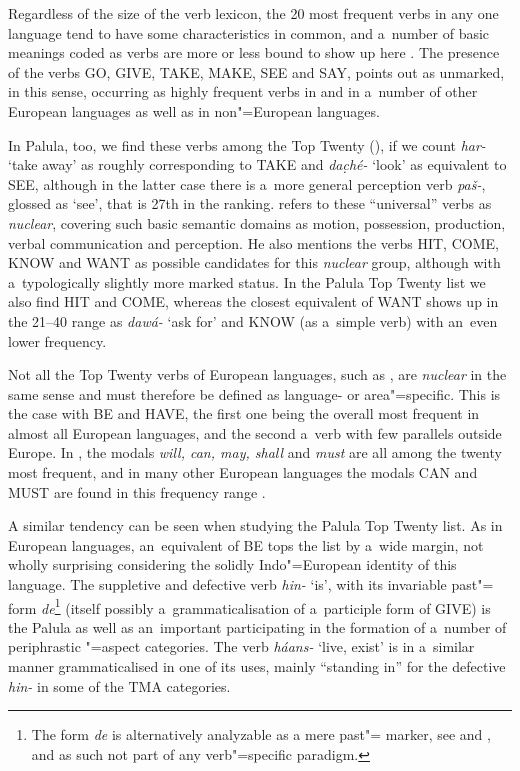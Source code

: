 Regardless of the size of the verb lexicon, the 20 most frequent verbs in any one language tend to have some characteristics in common, and a~number of basic meanings coded as verbs are more or less bound to show up here \citep[209]{viberg2006}. The presence of the verbs GO, GIVE, TAKE, MAKE, SEE and SAY, \citet[247]{viberg1993} points out as unmarked, in this sense, occurring as highly frequent verbs in  and in a~number of other European languages as well as in non"=European languages. 



In Palula, too, we find these verbs among the Top Twenty (), if we count \textit{har-} `take away' as roughly corresponding to TAKE and \textit{dac̣hé-} `look' as equivalent to SEE, although in the latter case there is a~more general perception verb \textit{paš-}, glossed as `see', that is 27th in the ranking. \citet[409]{viberg2006} refers to these ``universal'' verbs as \textit{nuclear}, covering such basic semantic domains as motion, possession, production, verbal communication and perception. He also mentions the verbs HIT, COME, KNOW and WANT as possible candidates for this \textit{nuclear} group, although with a~typologically slightly more marked status. In the Palula Top Twenty list we also find HIT and COME, whereas the closest equivalent of WANT shows up in the 21--40 range as \textit{dawá-} `ask for' and KNOW (as a~simple verb) with an~even lower frequency.



Not all the Top Twenty verbs of European languages, such as , are \textit{nuclear} in the same sense and must therefore be defined as language- or area"=specific. This is the case with BE and HAVE, the first one being the overall most frequent in almost all European languages, and the second a~verb with few parallels outside Europe. In , the modals \textit{will, can, may, shall} and \textit{must} are all among the twenty most frequent, and in many other European languages the modals CAN and MUST are found in this frequency range \citep[346--349]{viberg1993}. 



A similar tendency can be seen when studying the Palula Top Twenty list. As in European languages,
an~equivalent of BE tops the list by a~wide margin, not wholly surprising considering the solidly
Indo"=European identity of this language. The suppletive and defective verb \textit{hin-} `is', with its invariable past"= form \textit{de}\footnote{The form \textit{de} is alternatively analyzable as a mere past"= marker, see  and , and as such not part of any verb"=specific paradigm.} (itself possibly a~grammaticalisation of a~participle form of GIVE) is the Palula  as well as an~important  participating in the formation of a~number of periphrastic "=aspect categories. The verb \textit{háans-} `live, exist' is in a~similar manner grammaticalised in one of its uses, mainly ``standing in'' for the defective \textit{hin-} in some of the TMA categories.


